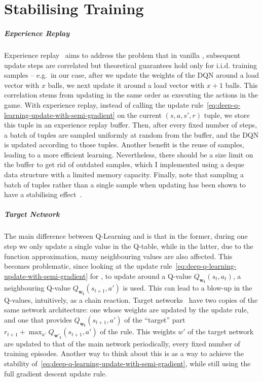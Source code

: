 \chapter{Stabilising Training}\label{stabilising-training} 



\paragraph{Experience Replay}

Experience replay~\cite{lin1992experiencereplay} aims to address the problem that in vanilla \DQL, subsequent update steps are correlated but theoretical guarantees hold only for i.i.d. training samples -- e.g.\  in our case, after we update the weights of the DQN around a load vector with $x$ balls, we next update it around a load vector with $x+1$ balls. This correlation stems from updating in the same order as executing the actions in the game. With experience replay, instead of calling the update rule~\eqref{eq:deep-q-learning-update-with-semi-gradient} on the current $(s, a, s', r)$ tuple, we store this tuple in an experience replay buffer. Then, after every fixed number of steps, a batch of tuples are sampled uniformly at random from the buffer, and the DQN is updated according to those tuples. Another benefit is the reuse of samples, leading to a more efficient learning. Nevertheless, there should be a size limit on the buffer to get rid of outdated samples, which I implemented using a deque data structure with a limited memory capacity. Finally, note that sampling a batch of tuples rather than a single sample when updating has been shown to have a stabilising effect~\cite{qian2020batchingsgd}.


\paragraph{Target Network}


The main difference between Q-Learning and \DQL is that in the former, during one step we only update a single value in the Q-table, while in the latter, due to the function approximation, many neighbouring values are also affected. This becomes problematic, since looking at the update rule~\eqref{eq:deep-q-learning-update-with-semi-gradient} for \DQL, to update around a Q-value $Q_{\mathbf{w_t}}(s_t, a_t)$, a neighbouring Q-value $Q_{\mathbf{w_t}}(s_{t+1}, a')$ is used. This can lead to a blow-up in the Q-values, intuitively, as a chain reaction. Target networks~\cite{fan2020target} have two copies of the same network architecture: one whose weights are updated by the update rule, and one that provides $Q_{\mathbf{w_t}}(s_{t+1}, a')$ of the ``target'' part $r_{t+1}+ \max_{a'} Q_{\mathbf{w'_t}}(s_{t+1}, a')$ of the rule. This weights $w'$ of the target network are updated to that of the main network periodically, every fixed number of training episodes. Another way to think about this is as a way to achieve the stability of~\eqref{eq:deep-q-learning-update-with-semi-gradient}, while still using the full gradient descent update rule.


